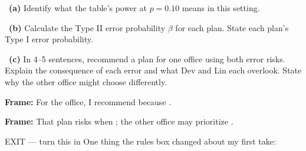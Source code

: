 \documentclass[11pt]{article}
\begin{document}
~\textbf{(a)} Identify what the table's power at $p=0.10$ means in this setting.\par
\workspace{0.8in}

~\textbf{(b)} Calculate the Type II error probability $\beta$ for each plan. State each plan's Type I error probability.\par
\workspace{1.4in}

~\textbf{(c)} In 4--5 sentences, recommend a plan for one office using both error risks. Explain the consequence of each error and what Dev and Lin each overlook. State why the other office might choose differently.\par
\workspace{2.0in}

\begin{sentenceframebox}\raggedright\textbf{Frame:} For the \blank[0.8in] office, I recommend \blank[0.6in] because \blank[2.2in].\end{sentenceframebox}

\begin{sentenceframebox}\raggedright\textbf{Frame:} That plan risks \blank[2.0in] when \blank[1.5in]; the other office may prioritize \blank[1.5in].\end{sentenceframebox}

\begin{summaryexitbox}{EXIT --- turn this in}
One thing the rules box changed about my first take: \hrulefill\par
\workspace{0.4in}
\end{summaryexitbox}
\end{document}
